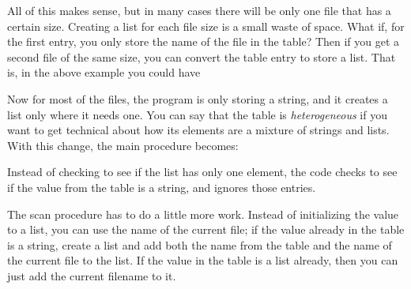 All of this makes sense, but in many cases there will be only one file
that has a certain size. Creating a list for each file size is a small
waste of space. What if, for the first entry, you only store the name
of the file in the table? Then if you get a second file of the same
size, you can convert the table entry to store a list. That is, in the
above example you could have


Now for most of the files, the program is only storing a string, and it
creates a list only where it needs one. You can say that the table is
\textit{heterogeneous} if you want to get technical about how its
elements are a mixture of strings and lists. With this change, the main
procedure becomes:


Instead of checking to see if the list has only one element, the code
checks to see if the value from the table is a string, and ignores
those entries.

The scan procedure has to do a little more work. Instead of initializing
the value to a list, you can use the name of the current file; if the
value already in the table is a string, create a list and add both the
name from the table and the name of the current file to the list. If
the value in the table is a list already, then you can just add the
current filename to it.

